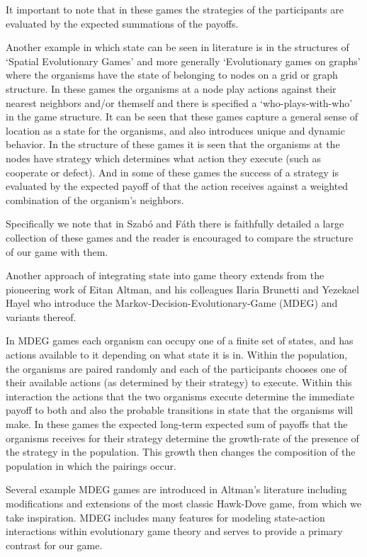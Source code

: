 It important to note that in these games the strategies of the participants are evaluated by the expected summations of the payoffs.

Another example in which state can be seen in literature is in the structures of `Spatial Evolutionary Games' and more generally `Evolutionary games on graphs' where the organisms have the state of belonging to nodes on a grid or graph structure. In these games the organisms at a node play actions against their nearest neighbors and/or themself and there is specified a `who-plays-with-who' in the game structure. It can be seen that these games capture a general sense of location as a state for the organisms, and also introduces unique and dynamic behavior.\cite{spacial1,nowak,spacial2,spacial3}
In the structure of these games it is seen that the organisms at the nodes have strategy which determines what action they execute (such as cooperate or defect). And in some of these games the success of a strategy is evaluated by the expected payoff of that the action receives against a weighted combination of the organism's neighbors.

Specifically we note that in Szabó and Fáth\cite{spacial4} there is faithfully detailed a large collection of these games and the reader is encouraged to compare the structure of our game with them.

Another approach of integrating state into game theory extends from the pioneering work of Eitan Altman, and his colleagues Ilaria Brunetti and Yezekael Hayel \cite{markov2,markov3,markov4,markov5,markov8,markov9} who introduce the Markov-Decision-Evolutionary-Game (MDEG) and variants thereof.

In MDEG games each organism can occupy one of a finite set of states, and has actions available to it depending on what state it is in.
Within the population, the organisms are paired randomly and each of the participants chooses one of their available actions (as determined by their strategy) to execute.
Within this interaction the actions that the two organisms execute determine the immediate payoff to both and also the probable transitions in state that the organisms will make.
In these games the expected long-term expected sum of payoffs that the organisms receives for their strategy determine the growth-rate of the presence of the strategy in the population.
This growth then changes the composition of the population in which the pairings occur.

Several example MDEG games are introduced in Altman's literature including modifications and extensions of the most classic Hawk-Dove game, from which we take inspiration.\cite{markov3,markov5}
MDEG includes many features for modeling state-action interactions within evolutionary game theory and serves to provide a primary contrast for our game.

